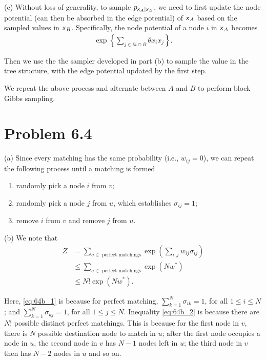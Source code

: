\documentclass{article}
\newcommand{\s}[1]{\textsf{\textit{#1}}}
\begin{document}
\noindent
(c) Without loss of generality, to sample $p_{\s{x}_A | \s{x}_B}$, we need to first
update the node potential (can then be absorbed in the edge potential) of
$\s{x}_A$ based on the sampled values in $\s{x}_B$. Specifically, the node potential
of a node $i$ in $\s{x}_A$ becomes
\begin{align*}
	\exp\left\{{\sum_{j \in \partial i \cap B} \theta}x_ix_j\right\}.
\end{align*}

Then we use the the sampler developed in part (b) to sample the value in the
tree structure, with the edge potential updated by the first step.

We repeat the above process and alternate between $A$ and $B$ to perform
block Gibbs sampling.
\pagebreak

\section*{Problem 6.4}
(a) Since every matching has the same probability (i.e., $w_{ij} = 0$), we can repeat
the following process until a matching is formed
\begin{enumerate}
	\item randomly pick a node $i$ from $v$;
	\item randomly pick a node $j$ from $u$, which establishes $\sigma_{ij}=1$;
	\item remove $i$ from $v$ and remove $j$ from $u$.\\
\end{enumerate}

\noindent
(b) We note that
\begin{align}
	Z &= \sum_{\sigma\in\text{ perfect matchings}} \exp\left(\sum_{i,j}w_{ij}\sigma_{ij}\right)\\
	&\leq \sum_{\sigma\in\text{ perfect matchings}} \exp\left(Nw^*\right) \label{eq:64b_1}\\
	&\leq N!\exp\left(Nw^*\right) \label{eq:64b_2}.
\end{align}

Here, \eqref{eq:64b_1} is because for perfect matching,
$\sum_{k=1}^N \sigma_{ik} = 1$, for all $1\leq i \leq N$; and
$\sum_{k=1}^N \sigma_{kj} = 1$, for all $1\leq j \leq N$.
Inequality \eqref{eq:64b_2} is because there are $N!$ possible
distinct perfect matchings. This is because for the first node in $v$,
there is $N$ possible destination node to match in $u$;
after the first node occupies a node in $u$, the second node in $v$ has $N-1$ nodes
left in $u$;
the third node in $v$ then has $N-2$ nodes in $u$ and so on.
\end{document}

